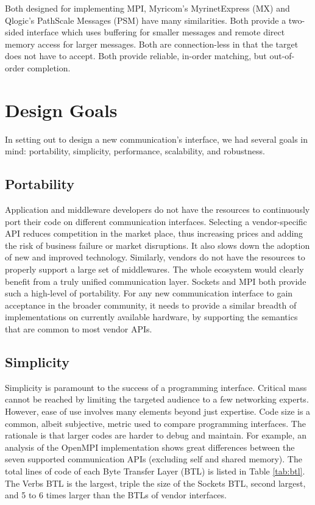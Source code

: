 \documentclass[conference]{IEEEtran}
\begin{document}
Both designed for implementing MPI, Myricom's MyrinetExpress (MX) and Qlogic's PathScale
Messages (PSM) have many similarities. Both provide a two-sided interface which uses
buffering for smaller messages and remote direct memory access for larger messages.  Both
are connection-less in that the target does not have to accept.  Both provide reliable,
in-order matching, but out-of-order completion.

\section{Design Goals}
In setting out to design a new communication's interface, we had several goals 
in mind: portability, simplicity, performance, scalability, and robustness.

\subsection{Portability}
Application and middleware developers do not have the resources to continuously 
port their code on different communication interfaces. 
Selecting a vendor-specific API reduces competition in the market place, thus 
increasing prices and adding the risk of business failure or market disruptions. It 
also slows down the adoption of new and improved technology. 
Similarly, vendors do not have the resources to properly support a large set 
of middlewares. The whole ecosystem would clearly benefit from a truly unified 
communication layer. 
Sockets and MPI both provide such a high-level of portability. 
For any new communication interface to gain acceptance in the broader 
community, it needs to provide a similar breadth of implementations on 
currently available hardware, by supporting the semantics that are common 
to most vendor APIs.

\subsection{Simplicity}
Simplicity is paramount to the success of a programming interface. Critical 
mass cannot be reached by limiting the targeted audience to a few networking 
experts. However, ease of use involves many elements beyond just expertise. 
Code size is a common, albeit subjective, metric used to compare programming 
interfaces. The rationale is that larger codes are harder to debug and 
maintain. For example, an analysis of the OpenMPI implementation shows great 
differences between the seven supported communication APIs (excluding self and 
shared memory). The total lines of code of each Byte Transfer Layer (BTL) is 
listed in Table \ref{tab:btl}. The Verbs BTL is the largest, triple the size 
of the Sockets BTL, second largest, and 5 to 6 times larger than the BTLs of 
vendor interfaces. 
\end{document}
